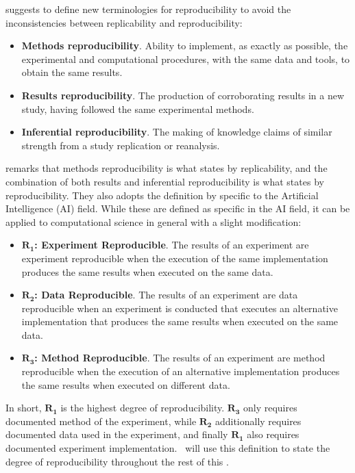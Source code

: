 \citet{goodmanWhatDoesResearch2016} suggests to define new terminologies for reproducibility to avoid the inconsistencies between replicability and reproducibility:
\begin{itemize}
	\item \textbf{Methods reproducibility}. Ability to implement, as exactly as possible, the experimental and computational procedures, with the same data and tools, to obtain the same results.
	\item \textbf{Results reproducibility}. The production of corroborating results in a new study, having followed the same experimental methods.
	\item \textbf{Inferential reproducibility}. The making of knowledge claims of similar strength from a study replication or reanalysis.
\end{itemize}

\citet{gundersenStateArtReproducibility2018} remarks that methods reproducibility is what \citet{drummondReplicabilityNotReproducibility2009} states by replicability, and the combination of both results and inferential reproducibility is what \citet{drummondReplicabilityNotReproducibility2009} states by reproducibility.
They also adopts the definition by \citet{goodmanWhatDoesResearch2016} specific to the Artificial Intelligence (AI) field.
While these are defined as specific in the AI field, it can be applied to computational science in general with a slight modification:
\begin{itemize}
	\item \textbf{$\bm{R_1}$: Experiment Reproducible}. The results of an experiment are experiment reproducible when the execution of the same implementation produces the same results when executed on the same data.
	\item \textbf{$\bm{R_2}$: Data Reproducible}. The results of an experiment are data reproducible when an experiment is conducted that executes an alternative implementation that produces the same results when executed on the same data.
	\item \textbf{$\bm{R_3}$: Method Reproducible}. The results of an experiment are method reproducible when the execution of an alternative implementation produces the same results when executed on different data.
\end{itemize}

In short, $\bm{R_1}$ is the highest degree of reproducibility.
$\bm{R_3}$ only requires documented method of the experiment, while $\bm{R_2}$ additionally requires documented data used in the experiment, and finally $\bm{R_1}$ also requires documented experiment implementation.
\I~will use this definition to state the degree of reproducibility throughout the rest of this \MakeLowercase{\type}.

